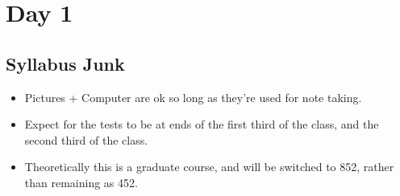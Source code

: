 \documentclass[../notes.tex]{subfiles}
\begin{document}
\section{Day 1}
\subsection{Syllabus Junk}
    \begin{itemize}
        \item Pictures + Computer are ok so long as they're used for note taking.
        \item Expect for the tests to be at ends of the first third of the class, and the second third of the class.
        \item Theoretically this is a graduate course, and will be switched to 852, rather than remaining as 452.
    \end{itemize}
\end{document}

